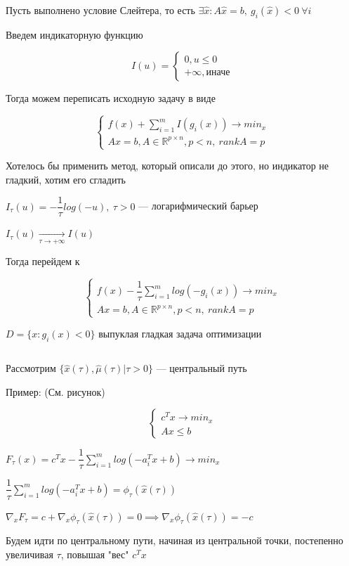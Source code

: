 Пусть выполнено условие Слейтера, то есть $\exists \hat{x} : A\hat{x} = b,  \ g_i(\hat{x}) < 0 \ \forall i$

Введем индикаторную функцию

\[I(u) = \begin{cases}
0, u \leqslant 0 \\
+\infty, \text{иначе}
\end{cases}
\]

Тогда можем переписать исходную задачу в виде

\[
\begin{cases}
f(x)  + \sum_{i=1}^{m} I(g_i(x))\to min_x \\
Ax = b, A \in \mathbb{R}^{p \times n}, p < n, \ rank A = p
\end{cases}
\]

Хотелось бы применить метод, который описали до этого, но индикатор не гладкий, хотим его сгладить

$I_{\tau}(u) = -\dfrac{1}{\tau} log(-u), \ \tau > 0$                                          —  логарифмический барьер

$I_{\tau}(u) \underset{\tau \to + \infty}{\to} I(u)$

Тогда перейдем к

$$
\begin{cases}
f(x)  - \dfrac{1}{\tau} \sum_{i=1}^{m} log(-g_i(x))\to min_x \\
Ax = b, A \in \mathbb{R}^{p \times n}, p < n, \ rank A = p
\end{cases}
$$

$D = \{x : g_i(x) < 0\}$
выпуклая гладкая задача оптимизации


$$$$

Рассмотрим $\{\hat{x}(\tau), \hat{\mu}(\tau)| \tau > 0 \}$   —  центральный путь

Пример: (См. рисунок)

\[
\begin{cases}
c^Tx \to min_x\\
Ax \leqslant b
\end{cases}
\]

$F_{\tau}(x) = c^Tx  - \dfrac{1}{\tau}\sum_{i=1}^m log(-a_i^Tx + b) \to min_x$

$\dfrac{1}{\tau}\sum_{i=1}^m log(-a_i^Tx + b)  = \phi_{\tau}(\hat{x}(\tau)) $

$\nabla_x F_{\tau} = c + \nabla_x \phi_{\tau}(\hat{x}(\tau)) = 0  \implies  \nabla_x \phi_{\tau}(\hat{x}(\tau)) = - c$

Будем идти по центральному пути, начиная из центральной точки, постепенно увеличивая $\tau$, повышая "вес" $c^Tx$

